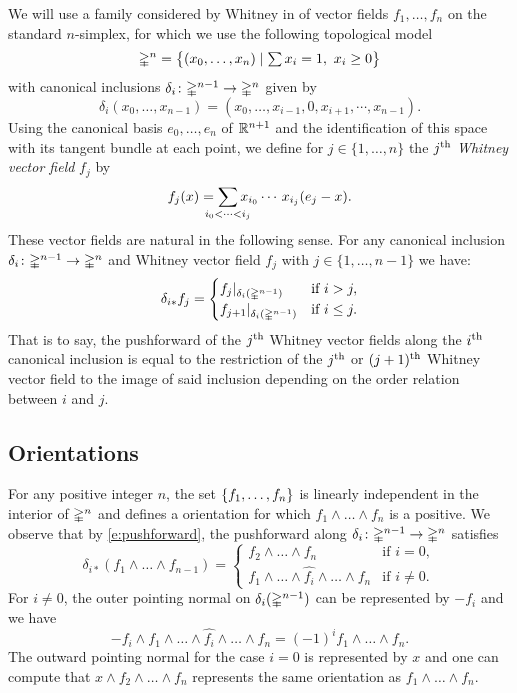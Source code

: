 We will use a family considered by Whitney in \cite{whitney1940sphere_bundles} of vector fields $f_1, \dots, f_n$ on the standard $n$-simplex, for which we use the following topological model
\[
\gsimplex^n = \set[\big]{(x_0, \dots, x_n) \mid \textstyle \sum x_i = 1,\ x_i \geq 0}
\]
with canonical inclusions $\delta_i \colon \gsimplex^{n-1} \to \gsimplex^n$ given by
\[
\delta_i(x_0, \dots, x_{n-1}) = (x_0, \dots, x_{i-1}, 0, x_{i+1}, \dotsm, x_{n-1}).
\]
Using the canonical basis $e_0, \dots, e_n$ of $\R^{n+1}$ and the identification of this space with its tangent bundle at each point, we define for $j \in \{1, \dots, n\}$ the $j^\th$ \textit{Whitney vector field} $f_j$ by
\[
f_j(x) = \sum_{\mathclap{i_0 < \dots < i_j}} x_{i_0} \dotsm \, x_{i_j} (e_j - x).
\]
These vector fields are natural in the following sense.
For any canonical inclusion $\delta_i \colon \gsimplex^{n-1} \to \gsimplex^n$ and Whitney vector field $f_j$ with $j \in \{1, \dots, n-1\}$ we have:
\begin{equation} \label{e:pushforward}
	\delta_{i\ast} f_j =
	\begin{cases}
		f_j |_{\delta_i(\gsimplex^{n-1})} & \text{if } i > j, \\
		f_{j+1} |_{\delta_i(\gsimplex^{n-1})} & \text{if } i \leq j.
	\end{cases}
\end{equation}
That is to say, the pushforward of the $j^\th$ Whitney vector fields along the $i^\th$ canonical inclusion is equal to the restriction of the $j^\th$ or $(j+1)^\th$ Whitney vector field to the image of said inclusion depending on the order relation between $i$ and $j$.

\subsection*{Orientations}

For any positive integer $n$, the set $\set{f_1, \dots, f_n}$ is linearly independent in the interior of $\gsimplex^n$ and defines a orientation for which $f_1 \wedge \dots \wedge f_n$ is a positive.
We observe that by \cref{e:pushforward}, the pushforward along $\delta_i \colon \gsimplex^{n-1} \to \gsimplex^n$ satisfies
\[
\delta_{i \ast} (f_1 \wedge \dots \wedge f_{n-1}) =
\begin{cases}
	f_2 \wedge \dots \wedge f_n &
	\text{if } i = 0, \\
	f_1 \wedge \dots \wedge \widehat{f_i} \wedge \dots \wedge f_n
	& \text{if } i \neq 0.
\end{cases}
\]
For $i \neq 0$, the outer pointing normal on $\delta_i(\gsimplex^{n-1})$ can be represented by $- f_i$ and we have
\[
-f_i \wedge f_1 \wedge \dots \wedge \widehat{f_i} \wedge \dots \wedge f_n =
(-1)^i f_1 \wedge \dots \wedge f_n.
\]
The outward pointing normal for the case $i = 0$ is represented by $x$ and one can compute that
$x \wedge f_2 \wedge \dots \wedge f_n$ represents the same orientation as $f_1 \wedge \dots \wedge f_n$.

